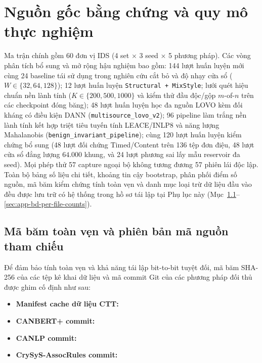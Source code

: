 \documentclass[12pt, a4paper, reqno, oneside]{book}
\DeclareRobustCommand{\code}[1]{\nolinkurl{#1}}
\begin{document}
\section{Nguồn gốc bằng chứng và quy mô thực nghiệm}\label{sec:app-provenance}
Ma trận chính gồm 60 đơn vị IDS (4 set $\times$ 3 seed $\times$ 5 phương pháp). Các vòng phân tích bổ sung và mở rộng hậu nghiệm bao gồm: 144 lượt huấn luyện mới cùng 24 baseline tái sử dụng trong nghiên cứu cắt bỏ và độ nhạy cửa sổ ($W \in \{32, 64, 128\}$); 12 lượt huấn luyện \code{Structural + MixStyle}; lưới quét hiệu chuẩn nền lành tính ($K \in \{200, 500, 1000\}$ và kiểm thử đầu độc/gộp $m$-of-$n$ trên các checkpoint đóng băng); 48 lượt huấn luyện học đa nguồn LOVO kèm đối kháng có điều kiện DANN (\code{multisource\_lovo\_v2}); 96 pipeline làm trắng nền lành tính kết hợp triệt tiêu tuyến tính LEACE/INLP8 và năng lượng Mahalanobis (\code{benign\_invariant\_pipeline}); cùng 120 lượt huấn luyện kiểm chứng bổ sung (48 lượt đối chứng Timed/Content trên 136 tệp đơn điệu, 48 lượt cửa sổ đẳng lượng $64.000$ khung, và 24 lượt phương sai lấy mẫu reservoir đa seed). Mọi phép thử 57 capture ngoại bộ không tương đương 57 phiên lái độc lập. Toàn bộ bảng số liệu chi tiết, khoảng tin cậy bootstrap, phân phối điểm số nguồn, mã băm kiểm chứng tính toàn vẹn và danh mục loại trừ dữ liệu đầu vào đều được lưu trữ có hệ thống trong hồ sơ tái lập tại Phụ lục này (Mục~\ref{subsec:app-hashes}--\ref{sec:app-bd-per-file-counts}).

\subsection{Mã băm toàn vẹn và phiên bản mã nguồn tham chiếu}\label{subsec:app-hashes}
Để đảm bảo tính toàn vẹn và khả năng tái lập bit-to-bit tuyệt đối, mã băm SHA-256 của các tệp kê khai dữ liệu và mã commit Git của các phương pháp đối thủ được ghim cố định như sau:
\begin{itemize}
\item \textbf{Manifest cache dữ liệu CTT:} \texttt{}
\item \textbf{CANBERT+ commit:} \texttt{}
\item \textbf{CANLP commit:} \texttt{}
\item \textbf{CrySyS-AssocRules commit:} \texttt{}
\end{itemize}
\end{document}

